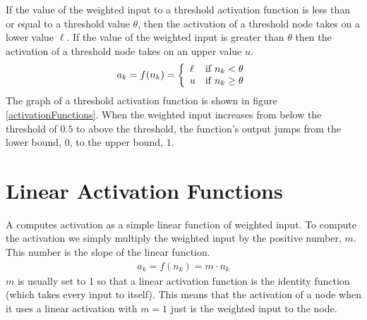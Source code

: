    If the value of the weighted input to a threshold activation function is less 
than or equal to a threshold value $\theta$, then the activation of a threshold 
node takes on a lower value $\ell$. If the value of the weighted input is greater 
than $\theta$ then the activation of a threshold node takes on an upper value 
$u$.
\begin{eqnarray*}
    a_k = f(n_k) =  \left\{
        \begin{array}{lc}
        \ell & {\rm if} \; n_k < \theta \\
        u  & {\rm if} \;  n_k \geq \theta
    \end{array} 
    \right.
\end{eqnarray*}
The graph of a  threshold activation function is shown in figure \ref{activationFunctions}. When the 
weighted input increases from below the threshold of $0.5$ to above the threshold,
the function's output jumps from the lower bound, $0$, to the upper bound, 
$1$.



\section{Linear Activation Functions}\label{S:linearact}

 A  computes activation as a simple linear function 
of weighted input. To compute the activation we simply multiply the weighted input 
by the positive number, $m$. This number is the slope of the linear function.
\begin{eqnarray*}
a_k = f(n_k) = m  \cdot n_k
\end{eqnarray*}
$m$ is usually set to 1 so that a linear activation function is the identity function (which takes every input to itself). This means that the activation of a node when it uses a linear activation with $m = 1$ just is the weighted input to the node.

